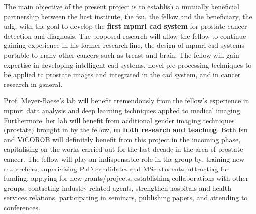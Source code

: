 The main objective of the present project is to establish a mutually beneficial partnership between the host institute, the \ac{fsu}, the fellow and the beneficiary, the \ac{udg}, with the goal to develop the \textbf{first \ac{mpmri} \ac{cad} system} for prostate cancer detection and diagnosis.
The proposed research will allow the fellow to continue gaining experience in his former research line, the design of \ac{mpmri} \ac{cad} systems portable to many other cancers such as breast and brain.
The fellow will gain expertise in developing intelligent \ac{cad} systems, novel pre-processing techniques to be applied to prostate images and integrated in the \ac{cad} system, and in cancer research in general.

Prof. Meyer-Baese's lab will benefit tremendously from the fellow's experience in \ac{mpmri} data analysis and deep learning techniques applied to medical imaging.
Furthermore, her lab will benefit from additional gender imaging techniques (prostate) brought in by the fellow, \textbf{in both research and teaching}.
Both \ac{fsu} and ViCOROB  will definitely benefit from this project in the incoming phase, capitalising on the works carried out for the last decade in the area of prostate cancer.
The fellow will play an indispensable role in the group by: training new researchers, superivising PhD candidates and MSc students, attracting for funding, applying for new grants/projects,  establishing collaborations with other groups, contacting industry related agents, strengthen hospitals and health services relations, participating in seminars, publishing papers, and attending to conferences.


